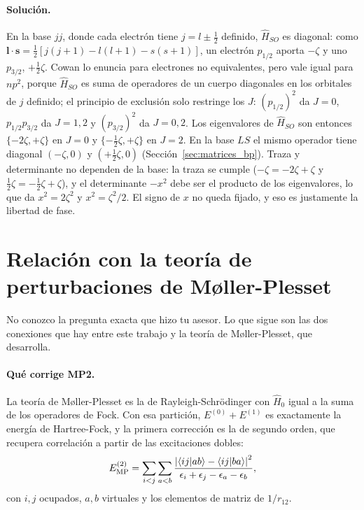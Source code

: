 \documentclass[11pt,a4paper]{article}
\begin{document}
\paragraph{Solución.} En la base $jj$, donde cada electrón tiene $j = l\pm\tfrac12$ definido,
$\hat{H}_{SO}$ es diagonal: como $\mathbf{l}\cdot\mathbf{s} = \tfrac12[j(j+1)-l(l+1)-s(s+1)]$, un
electrón $p_{1/2}$ aporta $-\zeta$ y uno $p_{3/2}$, $+\tfrac12\zeta$. Cowan lo enuncia para electrones
no equivalentes, pero vale igual para $np^2$, porque $\hat{H}_{SO}$ es suma de operadores de un
cuerpo diagonales en los orbitales de $j$ definido; el principio de exclusión solo restringe los
$J$: $(p_{1/2})^2$ da $J=0$, $p_{1/2}p_{3/2}$ da $J=1,2$ y $(p_{3/2})^2$ da $J=0,2$. Los eigenvalores
de $\hat{H}_{SO}$ son entonces $\{-2\zeta, +\zeta\}$ en $J=0$ y $\{-\tfrac12\zeta, +\zeta\}$ en $J=2$.
En la base $LS$ el mismo operador tiene diagonal $(-\zeta, 0)$ y $(+\tfrac12\zeta, 0)$
(Sección~\ref{sec:matrices_bp}). Traza y determinante no dependen de la base: la traza se cumple
($-\zeta = -2\zeta+\zeta$ y $\tfrac12\zeta = -\tfrac12\zeta + \zeta$), y el determinante $-x^2$ debe
ser el producto de los eigenvalores, lo que da $x^2 = 2\zeta^2$ y $x^2 = \zeta^2/2$. El signo de $x$
no queda fijado, y eso es justamente la libertad de fase.

\section{Relación con la teoría de perturbaciones de Møller-Plesset}
\label{det:mp}

No conozco la pregunta exacta que hizo tu asesor. Lo que sigue son las dos conexiones que hay entre
este trabajo y la teoría de Møller-Plesset, que \textcite[Capítulo 6]{Szabo1989} desarrolla.

\paragraph{Qué corrige MP2.} La teoría de Møller-Plesset es la de Rayleigh-Schrödinger con
$\hat{H}_0$ igual a la suma de los operadores de Fock. Con esa partición, $E^{(0)} + E^{(1)}$ es
exactamente la energía de Hartree-Fock, y la primera corrección es la de segundo orden, que
recupera correlación a partir de las excitaciones dobles:
\begin{equation}
  E^{(2)}_{\text{MP}} = \sum_{i<j}\sum_{a<b}
  \frac{\abs{\langle ij|ab\rangle - \langle ij|ba\rangle}^2}{\epsilon_i + \epsilon_j - \epsilon_a - \epsilon_b},
\end{equation}
con $i, j$ ocupados, $a, b$ virtuales y los elementos de matriz de $1/r_{12}$.
\end{document}
